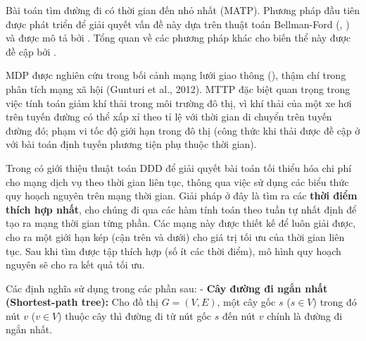 \documentclass[../main.tex]{subfiles}
\begin{document}
Bài toán tìm đường đi có thời gian đến nhỏ nhất (MATP). Phương pháp đầu
tiên được phát triển để giải quyết vấn đề này dựa trên thuật toán
Bellman-Ford (\cite{bellman1958routing}, \cite{ford2010flows}) và được mô tả bởi
\cite{cooke1966shortest}. Tổng quan về các phương pháp khác cho biến thể
này được đề cập bởi \cite{dean2004shortest}.

MDP được nghiên cứu trong bối cảnh mạng lưới giao thông (\cite{demiryurek2011online}), thậm chí trong phân tích mạng xã hội (Gunturi et al., 2012).
MTTP đặc biệt quan trọng trong việc tính toán giảm khí thải trong môi
trường đô thị, vì khí thải của một xe hơi trên tuyến đường có thể xấp xỉ
theo tỉ lệ với thời gian di chuyển trên tuyến đường đó; phạm vi tốc độ
giới hạn trong đô thị (công thức khi thải được đề cập ở \cite{jabali2012analysis} với bài toán định tuyến phương tiện phụ thuộc thời gian).

Trong \cite{boland2017continuous} có giới thiệu thuật toán DDD để giải quyết bài
toán tối thiểu hóa chi phí cho mạng dịch vụ theo thời gian liên tục,
thông qua việc sử dụng các biểu thức quy hoạch nguyên trên mạng thời
gian. Giải pháp ở đây là tìm ra các \textbf{thời điểm thích hợp nhất},
cho chúng đi qua các hàm tính toán theo tuần tự nhất định để tạo ra mạng
thời gian từng phần. Các mạng này được thiết kế để luôn giải được, cho
ra một giới hạn kép (cận trên và dưới) cho giá trị tối ưu của thời gian
liên tục. Sau khi tìm được tập thích hợp (số ít các thời điểm), mô hình
quy hoạch nguyên sẽ cho ra kết quả tối ưu.



Các định nghĩa sử dụng trong các phần sau: - \textbf{Cây đường đi ngắn
nhất (Shortest-path tree):} Cho đồ thị \(G=(V,E)\), một cây gốc \(s\)
(\(s\in V\)) trong đó nút \(v\) (\(v\in V\)) thuộc cây thì đường đi từ
nút gốc \(s\) đến nút \(v\) chính là đường đi ngắn nhất.
\backmatter
\end{document}
